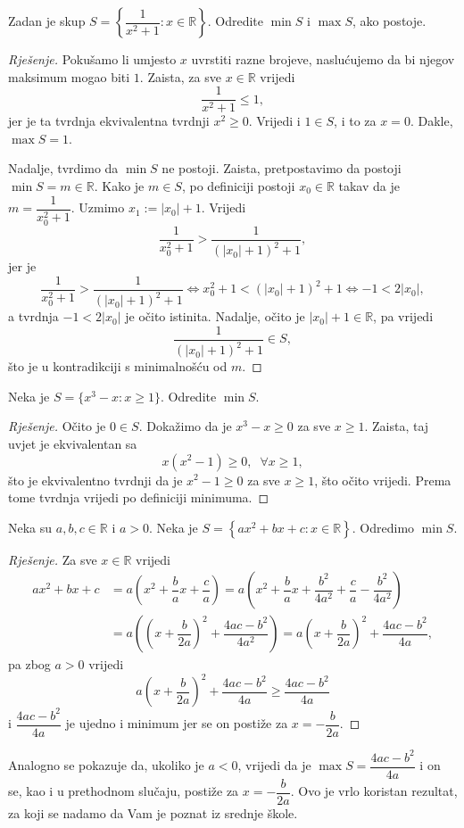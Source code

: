 \begin{exercise}
Zadan je skup $S=\left\{\dfrac{1}{x^2+1} : x\in \mathbb{R}\right\}$. Odredite $\min{S}$ i $\max{S}$, ako postoje.
\end{exercise}
\begin{proof}[Rješenje]
Pokušamo li umjesto $x$ uvrstiti razne brojeve, naslućujemo da bi njegov maksimum mogao biti $1$. Zaista, za sve $x\in \mathbb{R}$ vrijedi $$\dfrac{1}{x^2+1}\leq 1,$$ jer je ta tvrdnja ekvivalentna tvrdnji $x^2\geq 0$. Vrijedi i $1\in S$, i to za $x=0$. Dakle, $\max{S}=1$. 

Nadalje, tvrdimo da $\min{S}$ ne postoji. Zaista, pretpostavimo da postoji $\min{S}=m\in \mathbb{R}$. Kako je $m\in S$, po definiciji postoji $x_0\in \mathbb{R}$ takav da je $m=\dfrac{1}{x_0^2+1}$. Uzmimo $x_1:=|x_0|+1$. Vrijedi $$\dfrac{1}{x_0^2+1}> \dfrac{1}{(|x_0|+1)^2+1},$$
jer je
$$\dfrac{1}{x_0^2+1}> \dfrac{1}{(|x_0|+1)^2+1}\Leftrightarrow x_0^2+1<(|x_0|+1)^2+1\Leftrightarrow -1<2|x_0|,$$
a tvrdnja $-1<2|x_0|$ je očito istinita. Nadalje, očito je $|x_0|+1\in \mathbb{R}$, pa vrijedi $$\dfrac{1}{(|x_0|+1)^2+1}\in S,$$ što je u kontradikciji s minimalnošću od $m$.
\end{proof}
\begin{exercise}
Neka je $S=\{x^3-x : x\geq 1\}$. Odredite $\min{S}$.
\end{exercise}
\begin{proof}[Rješenje]
Očito je $0\in S$. Dokažimo da je $x^3-x\geq 0$ za sve $x\geq 1$. Zaista, taj uvjet je ekvivalentan sa 
$$x(x^2-1)\geq 0, \;\; \forall x\geq 1,$$
što je ekvivalentno tvrdnji da je $x^2-1\geq 0$ za sve $x\geq 1$, što očito vrijedi. Prema tome tvrdnja vrijedi po definiciji minimuma.
\end{proof}
\begin{exercise}
\label{tjeme}
Neka su $a, b, c\in \mathbb{R}$ i $a> 0$. Neka je $S=\left\{ax^2+bx+c : x\in \mathbb{R}\right\}$. Odredimo $\min{S}$.
\end{exercise}
\begin{proof}[Rješenje]
Za sve $x\in \mathbb{R}$ vrijedi
\begin{align*}
ax^2+bx+c&=a\left(x^2+\dfrac{b}{a}x+\dfrac{c}{a}\right)=a\left(x^2+\dfrac{b}{a}x+\dfrac{b^2}{4a^2}+\dfrac{c}{a}-\dfrac{b^2}{4a^2}\right)\\
&=a\left(\left(x+\dfrac{b}{2a}\right)^2+\dfrac{4ac-b^2}{4a^2}\right)=a\left(x+\dfrac{b}{2a}\right)^2+\dfrac{4ac-b^2}{4a},
\end{align*}
pa zbog $a>0$ vrijedi $$a\left(x+\dfrac{b}{2a}\right)^2+\dfrac{4ac-b^2}{4a}\geq \dfrac{4ac-b^2}{4a}$$ 
i $\dfrac{4ac-b^2}{4a}$ je ujedno i minimum jer se on postiže za $x=-\dfrac{b}{2a}$.
\end{proof}
\begin{remark}
Analogno se pokazuje da, ukoliko je $a<0$, vrijedi da je $\max{S}=\dfrac{4ac-b^2}{4a}$ i on se, kao i u prethodnom slučaju, postiže za $x=-\dfrac{b}{2a}$. Ovo je vrlo koristan rezultat, za koji se nadamo da Vam je poznat iz srednje škole.
\end{remark}

